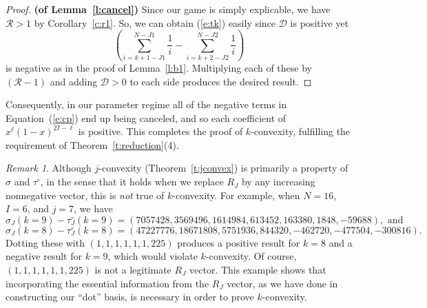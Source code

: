 \documentclass[11pt]{amsart}   %
\theoremstyle{definition}
\theoremstyle{remark}
\newtheorem{remark}[theorem]{Remark}
\numberwithin{equation}{section}
\theoremstyle{theorem}
\begin{document}
\begin{proof}{\bf (of Lemma~\ref{l:cancel})}
    Since our game is simply explicable, we have
    $\mathcal{R} > 1$ by Corollary~\ref{c:r1}.  So, we can obtain (\ref{e:tk}) easily since $\mathcal{D}$ is positive yet 
    \[ \left( \sum_{i=k+1-J1}^{N-J1} \frac{1}{i} - \sum_{i=k+2-J2}^{N-J2} \frac{1}{i} \right) \]
    is negative as in the proof of Lemma~\ref{l:b1}.  Multiplying each of these by $(\mathcal{R}-1)$ and adding $\mathcal{D} > 0$ to each side produces the desired result.
\end{proof}

Consequently, in our parameter regime all of the negative terms in Equation~(\ref{e:cp}) end up being canceled, and so each coefficient of $x^\ell (1-x)^{2I-\ell}$ is positive.  This completes the proof of $k$-convexity, fulfilling the requirement of Theorem~\ref{t:reduction}(4).

\begin{remark}
Although $j$-convexity (Theorem~\ref{t:jconvex}) is primarily a property of $\sigma$ and $\tau^\circ$, in the sense that it holds when we replace $R_J$ by any increasing nonnegative vector, this is {\em not} true of $k$-convexity.  For example, when $N = 16$, $I = 6$, and $j = 7$, we have 
\[ \sigma_J(k = 9) - \tau^\circ_J(k = 9) = (7057428, 3569496, 1614984, 613452, 163380, 1848, -59688), \text{ and } \]
\[ \sigma_J(k = 8) - \tau^\circ_J(k = 8) = (47227776, 18671808, 5751936, 844320, -462720, -477504, -300816). \]
Dotting these with $(1, 1, 1, 1, 1, 1, 225)$ produces a positive result for $k = 8$ and a negative result for $k = 9$, which would violate $k$-convexity.  Of course, $(1, 1, 1, 1, 1, 1, 225)$ is not a legitimate $R_J$ vector.  This example shows that incorporating the essential information from the $R_J$ vector, as we have done in constructing our ``dot'' basis, is necessary in order to prove $k$-convexity.
\end{remark}
\end{document}
